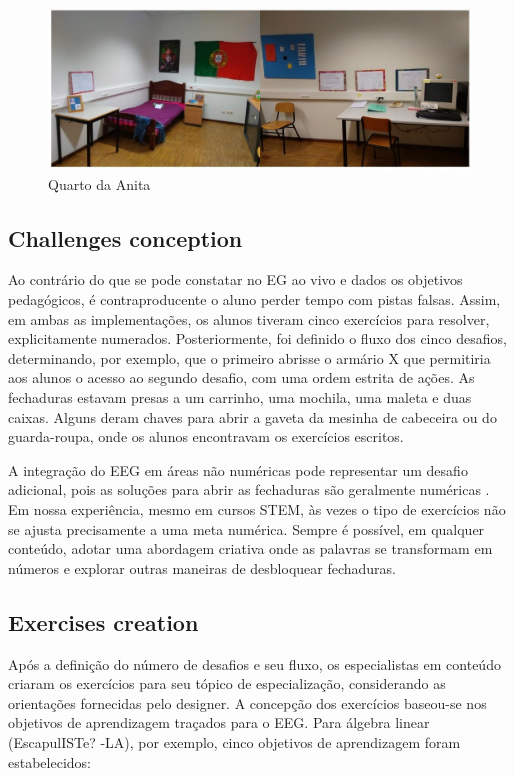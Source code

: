 \begin{figure}
    \centering
    \includegraphics[width=.9\textwidth]{chaps/Images/Figura2(1).jpeg}
    \caption{Quarto da Anita}
    \label{fig:quarto_anita}
\end{figure}

\subsection{Challenges conception}

Ao contrário do que se pode constatar no EG ao vivo e dados os objetivos pedagógicos, é contraproducente o aluno perder tempo com pistas falsas. Assim, em ambas as implementações, os alunos tiveram cinco exercícios para resolver, explicitamente numerados. Posteriormente, foi definido o fluxo dos cinco desafios, determinando, por exemplo, que o primeiro abrisse o armário X que permitiria aos alunos o acesso ao segundo desafio, com uma ordem estrita de ações. As fechaduras estavam presas a um carrinho, uma mochila, uma maleta e duas caixas. Alguns deram chaves para abrir a gaveta da mesinha de cabeceira ou do guarda-roupa, onde os alunos encontravam os exercícios escritos.

A integração do EEG em áreas não numéricas pode representar um desafio adicional, pois as soluções para abrir as fechaduras são geralmente numéricas \citep{guigon_model_2018}. Em nossa experiência, mesmo em cursos STEM, às vezes o tipo de exercícios não se ajusta precisamente a uma meta numérica. Sempre é possível, em qualquer conteúdo, adotar uma abordagem criativa onde as palavras se transformam em números e explorar outras maneiras de desbloquear fechaduras.

\subsection{Exercises creation}

Após a definição do número de desafios e seu fluxo, os especialistas em conteúdo criaram os exercícios para seu tópico de especialização, considerando as orientações fornecidas pelo designer. A concepção dos exercícios baseou-se nos objetivos de aprendizagem traçados para o EEG. Para álgebra linear (EscapulISTe? -LA), por exemplo, cinco objetivos de aprendizagem foram estabelecidos:

